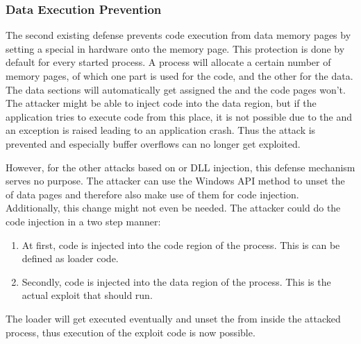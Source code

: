 \subsubsection{Data Execution Prevention}
The second existing defense prevents code execution from data memory pages by setting a special  \cite{msdn_dep} in hardware onto the memory page. This protection is done by default for every started process. A process will allocate a certain number of memory pages, of which one part is used for the code, and the other for the data. The data sections will automatically get assigned the  and the code pages won't. The attacker might be able to inject code into the data region, but if the application tries to execute code from this place, it is not possible due to the  and an exception is raised leading to an application crash. Thus the attack is prevented and especially buffer overflows can no longer get exploited.

However, for the other attacks based on  or DLL injection, this defense mechanism serves no purpose. The attacker can use the Windows API method  \cite{msdn_virtualprotect} to unset the  of data pages and therefore also make use of them for code injection. Additionally, this change might not even be needed. The attacker could do the code injection in a two step manner: 
\begin{enumerate}
\item At first, code is injected into the code region of the process. This is can be defined as loader code.
\item Secondly, code is injected into the data region of the process. This is the actual exploit that should run.
\end{enumerate}
The loader will get executed eventually and unset the  from inside the attacked process, thus execution of the exploit code is now possible. 